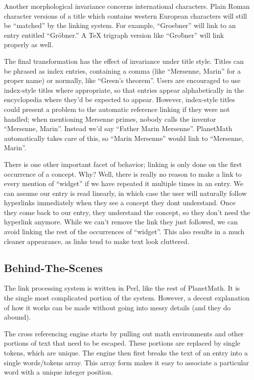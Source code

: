 Another morphological invariance concerns international characters. Plain Roman character versions of a title which contains western European characters will still be ``matched'' by the linking system. For example, ``Groebner'' will link to an entry entitled ``Gr\"obner.'' A TeX trigraph version like ``Gro\"bner'' will link properly as well.

The final transformation has the effect of invariance under title style. Titles can be phrased as index entries, containing a comma (like ``Mersenne, Marin'' for a proper name) or normally, like ``Green's theorem''. Users are encouraged to use index-style titles where appropriate, so that entries appear alphabetically in the encyclopedia where they'd be expected to appear. However, index-style titles could present a problem to the automatic reference linking if they were not handled; when mentioning Mersenne primes, nobody calls the inventor ``Mersenne, Marin''. Instead we'd say ``Father Marin Mersenne''. PlanetMath automatically takes care of this, so ``Marin Mersenne'' would link to ``Mersenne, Marin''.

There is one other important facet of behavior; linking is only done on the first occurrence of a concept. Why? Well, there is really no reason to make a link to every mention of ``widget'' if we have repeated it multiple times in an entry. We can assume our entry is read linearly, in which case the user will naturally follow hyperlinks immediately when they see a concept they dont understand. Once they come back to our entry, they understand the concept, so they don't need the hyperlink anymore. While we can't remove the link they just followed, we can avoid linking the rest of the occurrences of ``widget''. This also results in a much cleaner appearance, as links tend to make text look cluttered.

\subsection*{Behind-The-Scenes}
The link processing system is written in Perl, like the rest of PlanetMath. It is the single most complicated portion of the system. However, a decent explanation of how it works can be made without going into messy details (and they do abound).

The cross referencing engine starts by pulling out math environments and other portions of text that need to be escaped. These portions are replaced by single tokens, which are unique. The engine then first breaks the text of an entry into a single words/tokens array. This array form makes it easy to associate a particular word with a unique integer position.

